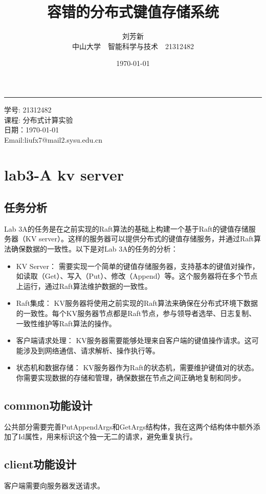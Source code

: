 \documentclass[]{article}
\title{容错的分布式键值存储系统}
\author{刘芳新\\ \footnotesize 中山大学~~智能科学与技术~~21312482}
\date{\today}
\begin{document}
	\maketitle
	\thispagestyle{fancy} %
	\vfill
	\hrule
	\footnotesize
	\vspace{12pt} %
	\begin{minipage}{\textwidth}
		\raggedright %
		学号: 21312482 \\ 
		课程: 分布式计算实验 \\ 
		日期：\today \\ 
		Email:liufx7@mail2.sysu.edu.cn
	\end{minipage}
	\normalsize 
	\newpage %
	\tableofcontents %
	\newpage %
	\section{lab3-A kv server}
	\subsection{任务分析}
	Lab 3A的任务是在之前实现的Raft算法的基础上构建一个基于Raft的键值存储服务器（KV server）。这样的服务器可以提供分布式的键值存储服务，并通过Raft算法确保数据的一致性。以下是对Lab 3A的任务的分析：
	\begin{itemize}
	\item KV Server： 需要实现一个简单的键值存储服务器，支持基本的键值对操作，如读取（Get）、写入（Put）、修改（Append）等。这个服务器将在多个节点上运行，通过Raft算法维护数据的一致性。
	\item Raft集成： KV服务器将使用之前实现的Raft算法来确保在分布式环境下数据的一致性。每个KV服务器节点都是Raft节点，参与领导者选举、日志复制、一致性维护等Raft算法的操作。
	\item 客户端请求处理： KV服务器需要能够处理来自客户端的键值操作请求。这可能涉及到网络通信、请求解析、操作执行等。
	\item 状态机和数据存储： KV服务器作为Raft的状态机，需要维护键值对的状态。你需要实现数据的存储和管理，确保数据在节点之间正确地复制和同步。
	\end{itemize}

	\subsection{common功能设计}
	公共部分需要完善PutAppendArgs和GetArgs结构体，我在这两个结构体中额外添加了Id属性，用来标识这个独一无二的请求，避免重复执行。
	\subsection{client功能设计}
	客户端需要向服务器发送请求。
\end{document}
